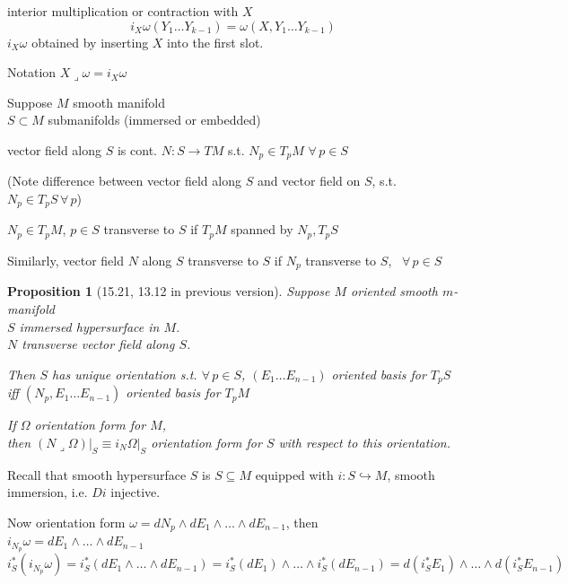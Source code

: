 \documentclass[11pt]{amsart}
\newtheorem{proposition}{Proposition}
\theoremstyle{definition}
\begin{document}
interior multiplication or contraction with $X$
\[
i_X\omega(Y_1 \dots Y_{k-1}) = \omega(X,Y_1 \dots Y_{k-1})
\]
$i_X \omega$ obtained by inserting $X$ into the first slot.

Notation $X \mathbin{\lrcorner} \omega = i_X \omega$









Suppose $M$ smooth manifold \\
\phantom{Suppose} $S\subset M$ submanifolds (immersed or embedded)

vector field along $S$ is cont. $N: S \to TM$ s.t. $N_p \in T_pM$ \quad $\forall \, p \in S$

(Note difference between vector field along $S$ and vector field on $S$, s.t. $N_p \in T_pS \, \forall \, p$)

$N_p \in T_pM$, $p\in S$ transverse to $S$ if $T_pM$ spanned by $N_p, T_pS$

Similarly, vector field $N$ along $S$ transverse to $S$ if $N_p$ transverse to $S$, \, $\forall \, p \in S$




\begin{proposition}[15.21, 13.12 in previous version] Suppose $M$ oriented smooth $m$-manifold \\
\phantom{Proposition 13.12 Suppose  } $S$ immersed hypersurface in $M$.  \\
\phantom{Proposition 13.12 Suppose  } $N$ transverse vector field along $S$.

Then $S$ has unique orientation s.t. $\forall \, p \in S$, $(E_1 \dots E_{n-1})$ oriented basis for $T_pS$ iff $(N_p, E_1 \dots E_{n-1})$ oriented basis for $T_pM$

If $\Omega$ orientation form for $M$, \\
then $\left. (N \mathbin{\lrcorner} \Omega) \right|_S \equiv \left. i_N\Omega \right|_S $ orientation form for $S$ with respect to this orientation.
\end{proposition}

Recall that smooth hypersurface $S$ is $S\subseteq M$ equipped with $i: S \hookrightarrow M$, smooth immersion, i.e. $Di$ injective.

Now orientation form $\omega = dN_p \wedge dE_1 \wedge \dots \wedge dE_{n-1}$, then \\
$i_{N_p} \omega  =dE_1 \wedge \dots \wedge dE_{n-1}$
\[
i^*_S (i_{N_p}\omega) = i^*_S (dE_1 \wedge \dots \wedge dE_{n-1}) = i^*_S(dE_1) \wedge \dots \wedge i^*_S(dE_{n-1}) = d(i^*_SE_1) \wedge \dots \wedge d(i_S^*E_{n-1})
\]
\end{document}
